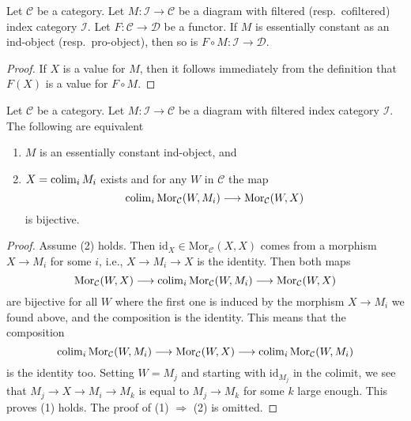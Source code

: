 \begin{lemma}
\label{lemma-image-essentially-constant}
Let $\mathcal{C}$ be a category. Let $M : \mathcal{I} \to \mathcal{C}$
be a diagram with filtered (resp.\ cofiltered) index category $\mathcal{I}$.
Let $F : \mathcal{C} \to \mathcal{D}$ be a functor.
If $M$ is essentially constant as an ind-object (resp.\ pro-object),
then so is $F \circ M : \mathcal{I} \to \mathcal{D}$.
\end{lemma}

\begin{proof}
If $X$ is a value for $M$, then it follows immediately from the
definition that $F(X)$ is a value for $F \circ M$.
\end{proof}

\begin{lemma}
\label{lemma-characterize-essentially-constant-ind}
Let $\mathcal{C}$ be a category. Let $M : \mathcal{I} \to \mathcal{C}$
be a diagram with filtered index category $\mathcal{I}$.
The following are equivalent
\begin{enumerate}
\item $M$ is an essentially constant ind-object, and
\item $X = \mathop{\rm colim}\nolimits_i M_i$ exists and for any $W$ in $\mathcal{C}$
the map
$$
\mathop{\rm colim}\nolimits_i \text{Mor}_{\mathcal{C}}(W, M_i) \longrightarrow
\text{Mor}_{\mathcal{C}}(W, X)
$$
is bijective.
\end{enumerate}
\end{lemma}

\begin{proof}
Assume (2) holds. Then $\text{id}_X \in \text{Mor}_{\mathcal{C}}(X, X)$
comes from a morphism $X \to M_i$ for some $i$, i.e., $X \to M_i \to X$
is the identity. Then both maps
$$
\text{Mor}_{\mathcal{C}}(W, X)
\longrightarrow
\mathop{\rm colim}\nolimits_i \text{Mor}_{\mathcal{C}}(W, M_i)
\longrightarrow
\text{Mor}_{\mathcal{C}}(W, X)
$$
are bijective for all $W$ where the first one is induced by the morphism
$X \to M_i$ we found above, and the composition is the identity. This means
that the composition
$$
\mathop{\rm colim}\nolimits_i \text{Mor}_{\mathcal{C}}(W, M_i)
\longrightarrow
\text{Mor}_{\mathcal{C}}(W, X)
\longrightarrow
\mathop{\rm colim}\nolimits_i \text{Mor}_{\mathcal{C}}(W, M_i)
$$
is the identity too. Setting $W = M_j$ and starting with $\text{id}_{M_j}$
in the colimit, we see that $M_j \to X \to M_i \to M_k$ is equal to
$M_j \to M_k$ for some $k$ large enough. This proves (1) holds.
The proof of (1) $\Rightarrow$ (2) is omitted.
\end{proof}

